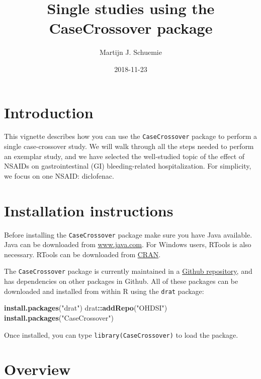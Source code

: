 \documentclass[]{article}
\title{Single studies using the CaseCrossover package}
\author{Martijn J. Schuemie}
\date{2018-11-23}
\newenvironment{Shaded}{\begin{snugshade}}{\end{snugshade}}
\newcommand{\KeywordTok}[1]{\textcolor[rgb]{0.13,0.29,0.53}{\textbf{#1}}}
\newcommand{\NormalTok}[1]{#1}
\newcommand{\OperatorTok}[1]{\textcolor[rgb]{0.81,0.36,0.00}{\textbf{#1}}}
\newcommand{\StringTok}[1]{\textcolor[rgb]{0.31,0.60,0.02}{#1}}
\begin{document}
\maketitle

{
\setcounter{tocdepth}{2}
\tableofcontents
}
\hypertarget{introduction}{%
\section{Introduction}\label{introduction}}

This vignette describes how you can use the \texttt{CaseCrossover}
package to perform a single case-crossover study. We will walk through
all the steps needed to perform an exemplar study, and we have selected
the well-studied topic of the effect of NSAIDs on gastrointestinal (GI)
bleeding-related hospitalization. For simplicity, we focus on one NSAID:
diclofenac.

\hypertarget{installation-instructions}{%
\section{Installation instructions}\label{installation-instructions}}

Before installing the \texttt{CaseCrossover} package make sure you have
Java available. Java can be downloaded from
\href{http://www.java.com}{www.java.com}. For Windows users, RTools is
also necessary. RTools can be downloaded from
\href{http://cran.r-project.org/bin/windows/Rtools/}{CRAN}.

The \texttt{CaseCrossover} package is currently maintained in a
\href{https://github.com/OHDSI/CaseCrossover}{Github repository}, and
has dependencies on other packages in Github. All of these packages can
be downloaded and installed from within R using the \texttt{drat}
package:

\begin{Shaded}
\begin{Highlighting}[]
\KeywordTok{install.packages}\NormalTok{(}\StringTok{"drat"}\NormalTok{)}
\NormalTok{drat}\OperatorTok{::}\KeywordTok{addRepo}\NormalTok{(}\StringTok{"OHDSI"}\NormalTok{)}
\KeywordTok{install.packages}\NormalTok{(}\StringTok{"CaseCrossover"}\NormalTok{)}
\end{Highlighting}
\end{Shaded}

Once installed, you can type \texttt{library(CaseCrossover)} to load the
package.

\hypertarget{overview}{%
\section{Overview}\label{overview}}
\end{document}
